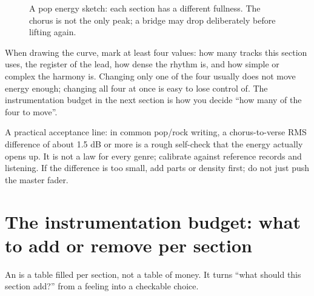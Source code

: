 \begin{figure}[htbp]
  \centering
  \caption{A pop energy sketch: each section has a different fullness. The chorus is not the only peak; a bridge may drop deliberately before lifting again.}
  \label{fig:energy-curve}
\end{figure}

When drawing the curve, mark at least four values: how many tracks this section uses, the register of the lead, how dense the rhythm is, and how simple or complex the harmony is. Changing only one of the four usually does not move energy enough; changing all four at once is easy to lose control of. The instrumentation budget in the next section is how you decide ``how many of the four to move''.

A practical acceptance line: in common pop/rock writing, a chorus-to-verse RMS difference of about 1.5 dB or more is a rough self-check that the energy actually opens up. It is not a law for every genre; calibrate against reference records and listening. If the difference is too small, add parts or density first; do not just push the master fader.

\section{The instrumentation budget: what to add or remove per section}
\label{sec:instrumentation-budget}

An  is a table filled per section, not a table of money. It turns ``what should this section add?'' from a feeling into a checkable choice.

